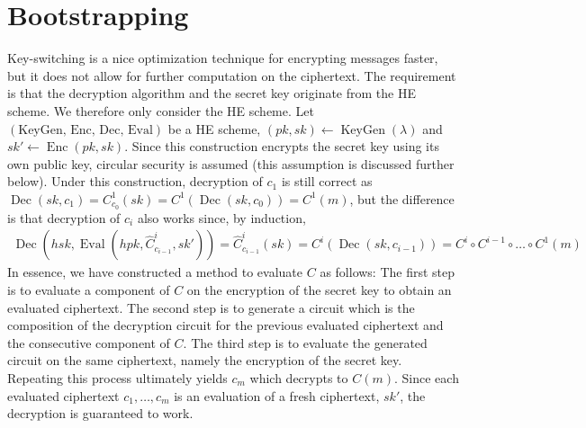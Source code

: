 \section{Bootstrapping}
Key-switching is a nice optimization technique for encrypting messages faster, but it does not allow for further computation on the ciphertext. The requirement is that the decryption algorithm and the secret key originate from the HE scheme. We therefore only consider the HE scheme. Let $(\text{KeyGen, Enc, Dec, Eval})$ be a HE scheme, $(pk, sk) \leftarrow \operatorname{KeyGen}(\lambda)$ and $sk' \leftarrow \operatorname{Enc}(pk, sk)$. Since this construction encrypts the secret key using its own public key, circular security is assumed (this assumption is discussed further below). Under this construction, decryption of $c_1$ is still correct as $\operatorname{Dec}(sk, c_1) = C^1_{c_0}(sk) = C^1(\operatorname{Dec}(sk,c_0)) = C^1(m)$, but the difference is that decryption of $c_i$ also works since, by induction,
\begin{equation*}
    \begin{aligned}
        \operatorname{Dec}(hsk,\operatorname{Eval}(hpk,\hat{C}^i_{c_{i-1}}, sk')) = \hat{C}^i_{c_{i-1}}(sk) = C^i(\operatorname{Dec}(sk, c_{i-1})) = C^i \circ C^{i-1} \circ  \dots \circ C^1(m)
    \end{aligned}
\end{equation*}
In essence, we have constructed a method to evaluate $C$ as follows: The first step is to evaluate a component of $C$ on the encryption of the secret key to obtain an evaluated ciphertext. The second step is to generate a circuit which is the composition of the decryption circuit for the previous evaluated ciphertext and the consecutive component of $C$. The third step is to evaluate the generated circuit on the same ciphertext, namely the encryption of the secret key. Repeating this process ultimately yields $c_m$ which decrypts to $C(m)$. Since each evaluated ciphertext $c_1, \dots, c_m$ is an evaluation of a fresh ciphertext, $sk'$, the decryption is guaranteed to work. 

